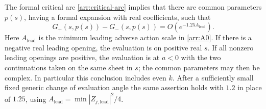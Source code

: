 \begin{proposition}
\label{arr:action-upper}
The formal critical arc \eqref{arr:critical-arc} implies
that there are common parameters \(p(s)\), having a formal
expansion with real coefficients, such that
\begin{equation}\label{arr:upper-estimate}
 G_+(s,p(s))-G_-(s,p(s))
                  =O(e^{-1.25A_{\mathrm{lead}}}).
\end{equation}
Here \(A_{\mathrm{lead}}\) is the minimum leading adverse action scale
in \eqref{arr:A0}.  If there is a negative real leading
opening, the evaluation is on positive real \(s\).
If all nonzero leading openings are positive, the
evaluation is at \(a<0\) with the two continuations taken
on the same sheet in \(s\); the common parameters may
then be complex.  In particular this conclusion includes
even \(k\).  After a sufficiently small fixed generic
change of evaluation angle the same assertion holds with
\(1.2\) in place of \(1.25\), using
\(A_{\mathrm{lead}}=\min |Z_{j,\mathrm{lead}}|^2/4\).
\end{proposition}

